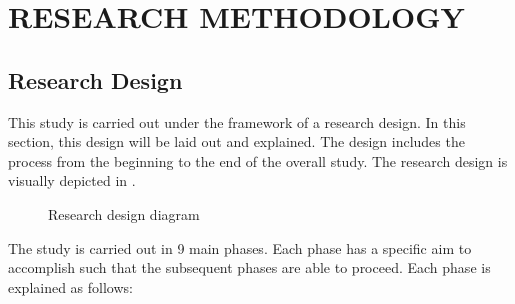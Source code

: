 \chapter{RESEARCH METHODOLOGY}\label{sec:research_methodology}


\section{Research Design}
\noindent This study is carried out under the framework of a research design. In this section, this design will be laid out and explained. The design includes the process from the beginning to the end of the overall study. The research design is visually depicted in .

\begin{figure}[h]
      \centering
      \caption{Research design diagram}\label{fig:research_design_diagram}
\end{figure}

The study is carried out in 9 main phases. Each phase has a specific aim to accomplish such that the subsequent phases are able to proceed. Each phase is explained as follows:

